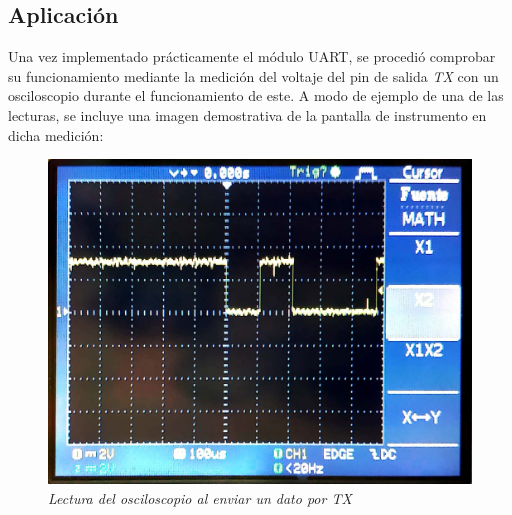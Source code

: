\documentclass{article}
\begin{document}
\subsection{Aplicación}

Una vez implementado prácticamente el módulo UART, se procedió comprobar su funcionamiento mediante la medición
del voltaje del pin de salida \textit{TX} con un osciloscopio durante el funcionamiento de este.
A modo de ejemplo de una de las lecturas, se incluye una imagen demostrativa de la pantalla de instrumento
en dicha medición:

\begin{figure}[H]
\includegraphics[scale=0.25]{osc}
\caption{\textit{Lectura del osciloscopio al enviar un dato por TX}}
\end{figure}
\end{document}
